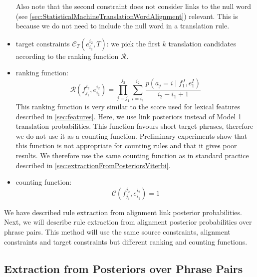 \begin{itemize}
%
Also note that the second
constraint does not consider links to the null
word (see \autoref{sec:StatisticalMachineTranslationWordAlignment}) relevant.
This is because we do not need to include the null word
in a translation rule.
  \item target constraints $\mathcal{C}_T(e_{i_1}^{i_2}, T)$: we pick the
    first $k$ translation candidates according to the ranking
    function $\mathcal{R}$.
  \item ranking function:
%
\begin{equation} \label{eq:linkPosRanking}
  \mathcal{R}(f_{j_1}^{j_2},e_{i_1}^{i_2}) = \prod_{j=j_1}^{j_2} \sum_{i=i_1}^{i_2} \frac{p(a_j = i \mid f_1^J,e_1^I)}{i_2-i_1+1}
\end{equation}
%
This ranking function is very similar to the score used for lexical features
described in \autoref{sec:features}. Here,
we use link posteriors instead of Model 1 translation probabilities. This
function favours short target phrases, therefore we do not use it as a counting
function. Preliminary experiments show that this function is not appropriate for
counting rules and that it gives poor results. We therefore use the same counting
function as in standard practice described in
\autoref{sec:extractionFromPosteriorsViterbi}.
  \item counting function:
%
\begin{equation}
  \mathcal{C}(f_{j_1}^{j_2},e_{i_1}^{i_2}) = 1
\end{equation}
%
\end{itemize}

We have described rule extraction from alignment link posterior
probabilities. Next, we will describe rule extraction from alignment
posterior probabilities over phrase pairs. This method will use the
same source constraints, alignment constraints and target constraints
but different ranking and counting functions.

\subsection{Extraction from Posteriors over Phrase Pairs}
\label{sec:extractionFromPosteriorsPhrasePair}


